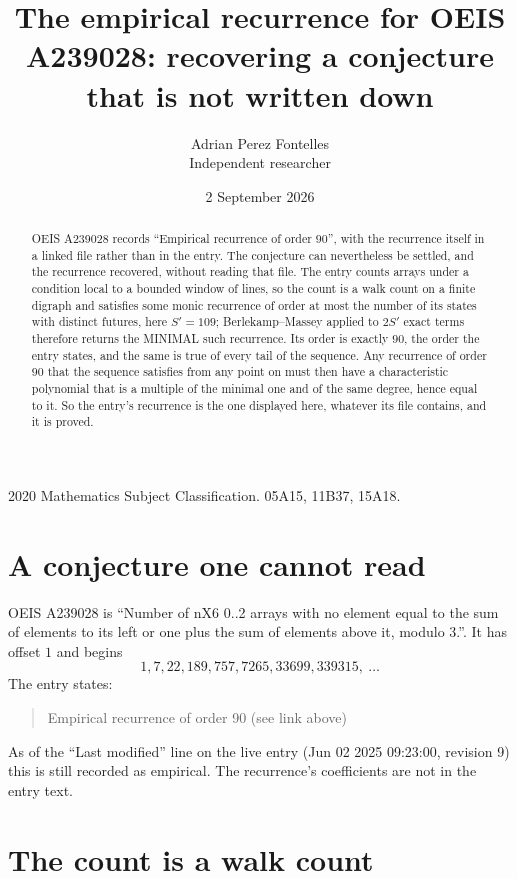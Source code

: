 \documentclass[11pt,a4paper]{article}
\title{The empirical recurrence for OEIS A239028: recovering a conjecture that is not written down}
\author{Adrian Perez Fontelles\\ \small Independent researcher}
\date{2 September 2026}
\theoremstyle{plain}
\theoremstyle{definition}
\begin{document}
\maketitle

\begin{abstract}
OEIS A239028 records ``Empirical recurrence of order $90$'', with the recurrence itself in a
linked file rather than in the entry. The conjecture can nevertheless be settled, and the
recurrence recovered, without reading that file. The entry counts arrays under a condition
local to a bounded window of lines, so the count is a walk count on a finite digraph and
satisfies some monic recurrence of order at most the number of its states with distinct
futures, here $S'=109$; Berlekamp--Massey applied to $2S'$ exact
terms therefore returns the MINIMAL such recurrence. Its order is exactly $90$, the order
the entry states, and the same is true of every tail of the sequence. Any recurrence of order
$90$ that the sequence satisfies from any point on must then have a characteristic
polynomial that is a multiple of the minimal one and of the same degree, hence equal to it. So
the entry's recurrence is the one displayed here, whatever its file contains, and it is
proved.
\end{abstract}

\noindent\small 2020 Mathematics Subject Classification. 05A15, 11B37, 15A18.\normalsize

\section{A conjecture one cannot read}

OEIS A239028 is ``Number of nX6 0..2 arrays with no element equal to the sum of elements to its left or one plus the sum of elements above it, modulo 3.''. It has offset $1$ and begins
\[
1, 7, 22, 189, 757, 7265, 33699, 339315,\ \dots
\]
The entry states:
\begin{quote}
Empirical recurrence of order 90 (see link above)
\end{quote}
As of the ``Last modified'' line on the live entry (Jun 02 2025 09:23:00, revision 9) this is still
recorded as empirical. The recurrence's coefficients are not in the entry text.

\section{The count is a walk count}
\end{document}

